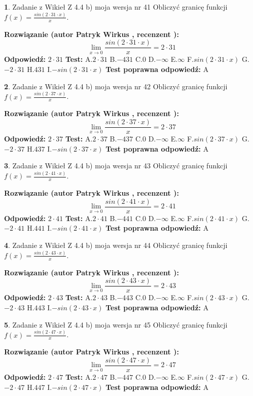 \documentclass[12pt, a4paper]{article}
\theoremstyle{definition} %
\newtheorem{zad}{}
\newcommand{\zadStart}[1]{\begin{zad}#1\newline}
\newcommand{\zadStop}{\end{zad}}
\newcommand{\rozwStart}[2]{\noindent \textbf{Rozwiązanie (autor #1 , recenzent #2): }\newline}
\newcommand{\rozwStop}{\newline}
\newcommand{\odpStart}{\noindent \textbf{Odpowiedź:}\newline}
\newcommand{\odpStop}{\newline}
\newcommand{\testStart}{\noindent \textbf{Test:}\newline}
\newcommand{\testStop}{\newline}
\newcommand{\kluczStart}{\noindent \textbf{Test poprawna odpowiedź:}\newline}
\newcommand{\kluczStop}{\newline}
\begin{document}
\zadStart{Zadanie z Wikieł Z 4.4 b) moja wersja nr 41}
Obliczyć granicę funkcji $f(x)=\frac{sin(2 \cdot31\cdot x)}{x}$.
\zadStop
\rozwStart{Patryk Wirkus}{}
$$\lim\limits_{x\to 0}\frac{sin(2 \cdot 31\cdot x)}{x}=
2 \cdot 31$$
\rozwStop
\odpStart
$2 \cdot 31$
\odpStop
\testStart
A.$2 \cdot 31$
B.$-431$
C.$0$
D.$-\infty$
E.$\infty$
F.$sin(2 \cdot 31\cdot x)$
G.$-2 \cdot 31$
H.$431$
I.$-sin(2 \cdot 31\cdot x)$
\testStop
\kluczStart
A
\kluczStop



\zadStart{Zadanie z Wikieł Z 4.4 b) moja wersja nr 42}
Obliczyć granicę funkcji $f(x)=\frac{sin(2 \cdot37\cdot x)}{x}$.
\zadStop
\rozwStart{Patryk Wirkus}{}
$$\lim\limits_{x\to 0}\frac{sin(2 \cdot 37\cdot x)}{x}=
2 \cdot 37$$
\rozwStop
\odpStart
$2 \cdot 37$
\odpStop
\testStart
A.$2 \cdot 37$
B.$-437$
C.$0$
D.$-\infty$
E.$\infty$
F.$sin(2 \cdot 37\cdot x)$
G.$-2 \cdot 37$
H.$437$
I.$-sin(2 \cdot 37\cdot x)$
\testStop
\kluczStart
A
\kluczStop



\zadStart{Zadanie z Wikieł Z 4.4 b) moja wersja nr 43}
Obliczyć granicę funkcji $f(x)=\frac{sin(2 \cdot41\cdot x)}{x}$.
\zadStop
\rozwStart{Patryk Wirkus}{}
$$\lim\limits_{x\to 0}\frac{sin(2 \cdot 41\cdot x)}{x}=
2 \cdot 41$$
\rozwStop
\odpStart
$2 \cdot 41$
\odpStop
\testStart
A.$2 \cdot 41$
B.$-441$
C.$0$
D.$-\infty$
E.$\infty$
F.$sin(2 \cdot 41\cdot x)$
G.$-2 \cdot 41$
H.$441$
I.$-sin(2 \cdot 41\cdot x)$
\testStop
\kluczStart
A
\kluczStop



\zadStart{Zadanie z Wikieł Z 4.4 b) moja wersja nr 44}
Obliczyć granicę funkcji $f(x)=\frac{sin(2 \cdot43\cdot x)}{x}$.
\zadStop
\rozwStart{Patryk Wirkus}{}
$$\lim\limits_{x\to 0}\frac{sin(2 \cdot 43\cdot x)}{x}=
2 \cdot 43$$
\rozwStop
\odpStart
$2 \cdot 43$
\odpStop
\testStart
A.$2 \cdot 43$
B.$-443$
C.$0$
D.$-\infty$
E.$\infty$
F.$sin(2 \cdot 43\cdot x)$
G.$-2 \cdot 43$
H.$443$
I.$-sin(2 \cdot 43\cdot x)$
\testStop
\kluczStart
A
\kluczStop



\zadStart{Zadanie z Wikieł Z 4.4 b) moja wersja nr 45}
Obliczyć granicę funkcji $f(x)=\frac{sin(2 \cdot47\cdot x)}{x}$.
\zadStop
\rozwStart{Patryk Wirkus}{}
$$\lim\limits_{x\to 0}\frac{sin(2 \cdot 47\cdot x)}{x}=
2 \cdot 47$$
\rozwStop
\odpStart
$2 \cdot 47$
\odpStop
\testStart
A.$2 \cdot 47$
B.$-447$
C.$0$
D.$-\infty$
E.$\infty$
F.$sin(2 \cdot 47\cdot x)$
G.$-2 \cdot 47$
H.$447$
I.$-sin(2 \cdot 47\cdot x)$
\testStop
\kluczStart
A
\kluczStop
\end{document}

